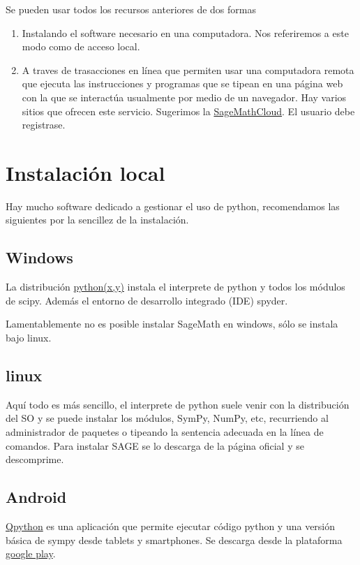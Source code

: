 \documentclass{article}
\begin{document}
Se pueden usar todos los recursos anteriores de dos formas
\begin{enumerate}
\item Instalando el software necesario en una computadora. Nos referiremos a este modo como de acceso local.

\item A traves de trasacciones en línea que permiten usar una computadora remota que ejecuta las instrucciones y programas que se tipean en una página web con la que se interactúa usualmente por medio de un navegador.  Hay varios sitios que ofrecen este servicio. Sugerimos la \href{https://cloud.sagemath.com/}{SageMathCloud}. El usuario debe registrase.
\end{enumerate}



\section{Instalación local}

Hay mucho software dedicado a gestionar el uso de python, recomendamos las siguientes por la sencillez de la instalación.  

\subsection{Windows} La distribución  \href{https://code.google.com/p/pythonxy/}{python(x,y)}  instala el interprete de python y todos los módulos de scipy. Además el entorno de desarrollo integrado (IDE) spyder.

Lamentablemente no es posible instalar SageMath en windows, sólo se instala bajo linux.

\subsection{linux} Aquí todo es más sencillo, el interprete de python suele venir con la distribución del SO y se puede instalar los módulos, SymPy, NumPy, etc, recurriendo al administrador de paquetes o tipeando la sentencia adecuada en la línea de comandos.  Para instalar SAGE se lo descarga de la página oficial y se descomprime.

\subsection{Android} \href{http://qpython.com/}{Qpython} es una aplicación que permite ejecutar código python y una versión básica de sympy desde tablets y smartphones. Se descarga desde la plataforma \href{https://play.google.com/store/apps/details?id=com.hipipal.qpyplus}{google play}.
\end{document}
